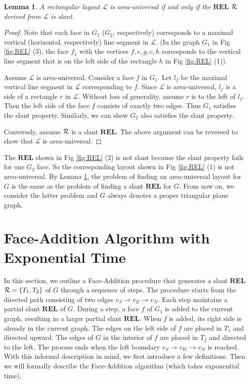 \documentclass[11pt]{article}
\newcommand{\R}{{\cal R}}
\newcommand{\LL}{\mathcal{L}}
\newcommand{\REL}{\mathbf{REL}}
\newtheorem{lemma}[figure]{Lemma}
\begin{document}
\begin{lemma}\label{lemma:slant}
A rectangular layout $\LL$ is area-universal if and
only if the $\REL$ $\R$ derived from $\LL$ is slant.
\end{lemma}
\begin{proof}
Note that each face in $G_1$ ($G_2$, respectively) corresponds
to a maximal vertical (horizontal, respectively) line
segment in $\LL$. (In the graph $G_1$ in Fig
\ref{fig:REL} (3), the face $f_1$ with the vertices $f,e,g,c,h$
corresponds to the vertical line segment that is on the left side
of the rectangle $h$ in Fig \ref{fig:REL} (1)).

Assume $\LL$ is area-universal. Consider a face $f$ in $G_1$. Let
$l_f$ be the maximal vertical line segment in $\LL$ corresponding to
$f$. Since $\LL$ is area-universal, $l_f$ is a side of a rectangle
$r$ in $\LL$. Without loss of generality, assume $r$ is to the left
of $l_f$. Then the left side of the face $f$ consists
of exactly two edges. Thus $G_1$ satisfies the slant property.
Similarly, we can show $G_2$ also satisfies the slant property.

Conversely, assume $\R$ is a slant $\REL$. The above argument can be
reversed to show that $\LL$ is area-universal.
\end{proof}

The $\REL$ shown in Fig \ref{fig:REL} (2) is not slant because
the slant property fails for one $G_2$ face.
So the corresponding layout shown in Fig \ref{fig:REL} (1)
is not area-universal. By Lemma \ref{lemma:slant}, the problem of
finding an area-universal layout for $G$ is the same as the problem
of finding a slant $\REL$ for $G$. From now on, we consider the
latter problem and $G$ always denotes a proper triangular plane graph.

\section{Face-Addition Algorithm with Exponential Time}\label{sec:outline}

In this section, we outline a Face-Addition procedure that generates
a slant $\REL$ $\R =\{T_1,T_2\}$ of $G$ through a sequence of steps.
The procedure starts from the directed path consisting of two edges
$v_S \rightarrow v_E \rightarrow v_N$. Each step maintains a partial
slant $\REL$ of $G$. During a step, a face $f$ of $G_1$ is added to the
current graph, resulting in a larger partial slant $\REL$. When $f$ is
added, its right side is already in the current graph. The edges on the
left side of $f$ are placed in $T_1$ and directed upward. The edges
of $G$ in the interior of $f$ are placed in $T_2$ and directed to the
left. The process ends when the left boundary $v_S \rightarrow v_W
\rightarrow v_N$ is reached. With this informal description in mind,
we first introduce a few definitions. Then we will formally
describe the Face-Addition algorithm (which takes exponential time).
\end{document}
